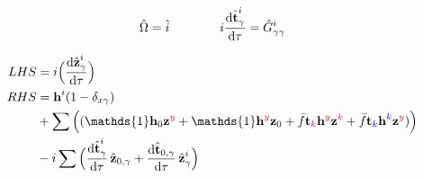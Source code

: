 \documentclass{article}
\newcommand{\bh}{\textbf{h}}
\newcommand{\bt}{\textbf{t}}
\newcommand{\bz}{\textbf{z}}
\newcommand{\down}[1]{\hat{#1}}
\begin{document}
%
%
%
%
%

\begin{equation}
    \hat{\Omega} = \down{i}
\qquad\qquad
    i\dv{\hat{\bt}^{i}_{\gamma}}{\tau} = \hat{G}^{i}_{\gamma\gamma}
\end{equation}

%
%
%
%
%

\begin{align}\begin{split}
LHS &=
    i\Big(\dv{\hat{\bz}^{i}_{\gamma}}{\tau}\Big)
\\ RHS &=
%
%
\bh^{i}(1-\delta_{x\gamma})\\&+\sum\Big((\mathds{1}\bh_0\bz^{\red{y}} + \mathds{1}\bh^{\blue{}\red{y}}\bz_0 + \bar{f}\bt_{\magenta{}\blue{}\magenta{k}\red{}}\bh^{\blue{}\blue{}\red{y}}\bz^{\magenta{k}\red{}} + \bar{f}\bt_{\magenta{}\blue{k}\magenta{}\red{}}\bh^{\blue{k}\blue{}\red{}}\bz^{\magenta{}\red{y}})\Big)\\&-i\sum\Big(\dv{\hat{\bt}^{i}_{\gamma}}{\tau}\,\hat{\bz}_{0, \gamma} + \dv{\hat{\bt}_{0, \gamma}}{\tau}\,\hat{\bz}^{i}_{\gamma}\Big)
\end{split}\end{align}
\end{document}
